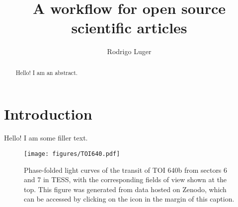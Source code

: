 \documentclass[twocolumn]{aastex631}
\begin{document}
\title{A workflow for open source scientific articles}

\author[0000-0002-0296-3826]{Rodrigo Luger}

\begin{abstract}
    Hello! I am an abstract.
\end{abstract}

\section{Introduction}
\label{sec:intro}

Hello! I am some filler text.

\begin{figure}[ht!]
    \begin{centering}
        \texttt{[image: figures/TOI640.pdf]}
        \caption{
            Phase-folded light curves of the transit of TOI 640b from sectors 6 and 7 in TESS, with the corresponding fields of view shown at the top.
            This figure was generated from data hosted on Zenodo, which can be accessed by clicking on the icon in the margin of this caption.
        }
        \label{fig:TOI640}
    \end{centering}
\end{figure}
\end{document}
